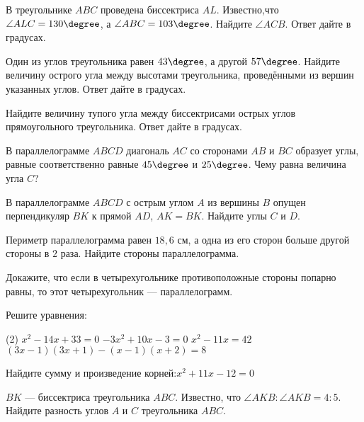 %
%
\begin{homework}[number=3]
	\begin{listofex}
		\item В треугольнике \( ABC \) проведена биссектриса \( AL \). Известно,что \( \angle ALC=130\degree \),
		а \( \angle ABC =103\degree \).
		Найдите \( \angle ACB \).
		Ответ дайте в градусах.
		\item Один из углов треугольника равен \( 43\degree \), а другой \( 57\degree \).
		Найдите величину острого угла между высотами треугольника,
		проведёнными из вершин указанных углов.
		Ответ дайте в градусах.
		\item Найдите величину тупого угла между биссектрисами острых
		углов прямоугольного треугольника. Ответ дайте в градусах.
	\end{listofex}
\end{homework}
%	
%

%
%
\begin{exam}
	\begin{listofex}
		\item В параллелограмме  \(ABCD\) диагональ \(AC\) со сторонами \(AB\) и \(BC\) образует углы, равные соответственно равные \(45\degree\) и \(25\degree\). Чему равна величина угла \( C \)?
		\item В параллелограмме \(ABCD\)  с острым углом \(A\) из вершины \(B\) опущен перпендикуляр \(BK\) к прямой \(AD\), \(AK=BK\). Найдите углы \(C\) и \(D\).
		\item Периметр параллелограмма равен \( 18,6 \) см, а одна из его сторон больше другой стороны в \( 2 \)  раза. Найдите стороны параллелограмма.
		\item Докажите, что если в четырехугольнике противоположные стороны попарно равны, то этот четырехугольник --- параллелограмм. 
		\item Решите уравнения:
		\begin{tasks}(2)
			\task \(x^2-14x+33=0\)
			\task \(-3x^2+10x-3=0\)
			\task \(x^2-11x=42\)
			\task \((3x-1)(3x+1)-(x-1)(x+2)=8\)
		\end{tasks}
		\item Найдите сумму и произведение корней:\quad\(x^2+11x-12=0\)
		\item \( BK \) --- биссектриса треугольника \( ABC \). Известно,
		что \( \angle AKB : \angle AKB = 4 : 5 \).
		Найдите разность углов \( A \) и \( C \) треугольника \( ABC \).
	\end{listofex}
\end{exam}
%
%
